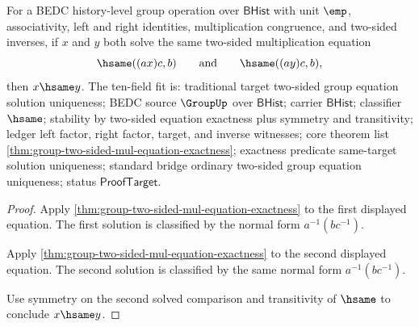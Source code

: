 \begin{theorem}
\label{thm:group-two-sided-mul-equation-solution-unique}
For a BEDC history-level group operation over $\mathsf{BHist}$ with unit
$\emp$, associativity, left and right identities, multiplication congruence,
and two-sided inverses, if $x$ and $y$ both solve the same two-sided
multiplication equation
$$
\hsame((a x)c,b)
\qquad\text{and}\qquad
\hsame((a y)c,b),
$$
then $x\hsame y$.
The ten-field fit is: traditional target two-sided group equation solution
uniqueness; BEDC source $\GroupUp$ over $\mathsf{BHist}$; carrier
$\mathsf{BHist}$; classifier $\hsame$; stability by two-sided equation
exactness plus symmetry and transitivity; ledger left factor, right factor,
target, and inverse witnesses; core theorem list
\autoref{thm:group-two-sided-mul-equation-exactness}; exactness predicate
same-target solution uniqueness; standard bridge ordinary two-sided group
equation uniqueness; status $\mathsf{ProofTarget}$.
\end{theorem}
\begin{proof}
Apply \autoref{thm:group-two-sided-mul-equation-exactness} to the first
displayed equation. The first solution is classified by the normal form
$a^{-1}(b c^{-1})$.

Apply \autoref{thm:group-two-sided-mul-equation-exactness} to the second
displayed equation. The second solution is classified by the same normal form
$a^{-1}(b c^{-1})$.

Use symmetry on the second solved comparison and transitivity of $\hsame$ to
conclude $x\hsame y$.
\end{proof}

